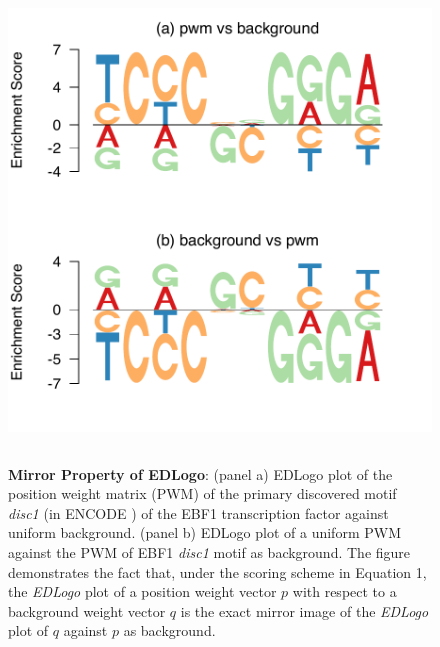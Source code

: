 \documentclass{bmcart}
\begin{document}
\begin{figure}[h!]
\centering
\includegraphics[height=5in, width=5in]{suppfig/Figure1.pdf}
\caption{\textbf{Mirror Property of EDLogo}: (panel a) EDLogo plot of the  position weight matrix (PWM) of the primary discovered motif \textit{disc1} (in ENCODE \cite{Kheradpour2013}) of the EBF1 transcription factor against uniform background. (panel b) EDLogo plot of a uniform PWM against the PWM of  EBF1 \textit{disc1} motif as background. The figure demonstrates the fact that, under the scoring scheme in Equation 1, the \textit{EDLogo} plot of a position weight vector $p$ with respect to a background weight vector $q$ is the exact mirror image of the \textit{EDLogo} plot of $q$ against $p$ as background.}
\label{fig:suppfig1}
\end{figure}
\end{document}
